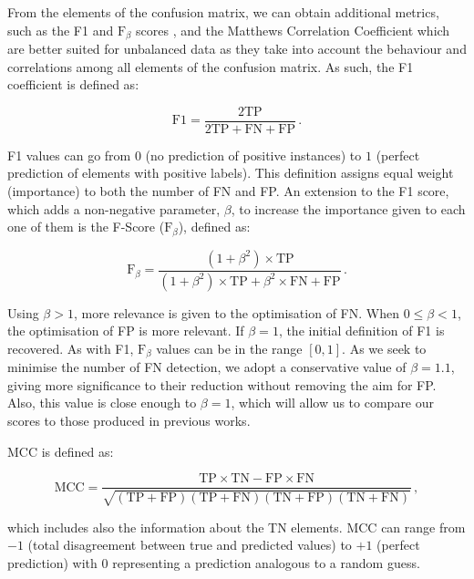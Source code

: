 \documentclass{aa}
\begin{document}
From the elements of the confusion matrix, we can obtain additional metrics, such as the F1 and $\mathrm{F}_{\beta}$ scores \citep{10.2307/1932409, sorenson1948method, van1979information}, and the Matthews Correlation Coefficient \citep[MCC;][]{10.2307/2340126, nla.cat-vn81100, MATTHEWS1975442} which are better suited for unbalanced data as they take into account the behaviour and correlations among all elements of the confusion matrix.
As such, the F1 coefficient is defined as: 

\begin{equation}\label{eq:f1}
\mathrm{F1} = \frac{2 \mathrm{TP}}{2 \mathrm{TP} + \mathrm{FN} + \mathrm{FP}}\,.
\end{equation}

\noindent 
F1 values can go from $0$ (no prediction of positive instances) to $1$ (perfect prediction of elements with positive labels). This definition assigns equal weight (importance) to both the number of FN and FP. An extension to the F1 score, which adds a non-negative parameter, $\beta$, to increase the importance given to each one of them is the F-Score ($\mathrm{F}_{\beta}$), defined as:

\begin{equation}\label{eq:f_beta}
\mathrm{F}_{\beta} = \frac{(1 + \beta^{2}) \times \mathrm{TP}}{(1 + \beta^{2}) \times \mathrm{TP} + \beta^{2} \times \mathrm{FN} + \mathrm{FP}}\,.
\end{equation}

Using ${\beta > 1}$, more relevance is given to the optimisation of FN. When ${0 \leq \beta < 1}$, the optimisation of FP is more relevant. If $\beta = 1$, the initial definition of F1 is recovered. As with F1, $\mathrm{F}_{\beta}$ values can be in the range ${[0, 1]}$. As we seek to minimise the number of FN detection, we adopt a conservative value of ${\beta = 1.1}$, giving more significance to their reduction without removing the aim for FP. Also, this value is close enough to $\beta = 1$, which will allow us to compare our scores to those produced in previous works.

MCC is defined as:

\begin{equation}\label{eq:mcc}
\mathrm{MCC} = \frac{\mathrm{TP} \times \mathrm{TN} - \mathrm{FP} \times \mathrm{FN}}{\sqrt{(\mathrm{TP} + \mathrm{FP}) (\mathrm{TP} + \mathrm{FN}) (\mathrm{TN} + \mathrm{FP}) (\mathrm{TN} + \mathrm{FN})}}\,,
\end{equation}

\noindent which includes also the information about the TN elements. MCC can range from $-1$ (total disagreement between true and predicted values) to $+1$ (perfect prediction) with $0$ representing a prediction analogous to a random guess.
\end{document}
